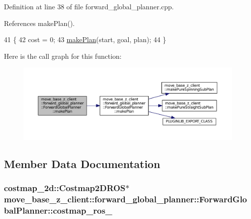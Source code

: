 Definition at line 38 of file forward\+\_\+global\+\_\+planner.\+cpp.



References make\+Plan().


\begin{DoxyCode}
41 \{
42     cost = 0;
43     \hyperlink{classmove__base__z__client_1_1forward__global__planner_1_1ForwardGlobalPlanner_a2dcf9aad74efaaa92ee78650f7a23096}{makePlan}(start, goal, plan);
44 \}
\end{DoxyCode}


Here is the call graph for this function\+:
\nopagebreak
\begin{figure}[H]
\begin{center}
\leavevmode
\includegraphics[width=350pt]{classmove__base__z__client_1_1forward__global__planner_1_1ForwardGlobalPlanner_a16f21fc4735c26535517678d29a6f1f3_cgraph}
\end{center}
\end{figure}




\subsection{Member Data Documentation}
\subsubsection[{\texorpdfstring{costmap\+\_\+ros\+\_\+}{costmap_ros_}}]{\setlength{\rightskip}{0pt plus 5cm}costmap\+\_\+2d\+::\+Costmap2\+D\+R\+OS$\ast$ move\+\_\+base\+\_\+z\+\_\+client\+::forward\+\_\+global\+\_\+planner\+::\+Forward\+Global\+Planner\+::costmap\+\_\+ros\+\_\+\hspace{0.3cm}{\ttfamily [private]}}\hypertarget{classmove__base__z__client_1_1forward__global__planner_1_1ForwardGlobalPlanner_aba11d85f5f4c9370873195ca97497a22}{}\label{classmove__base__z__client_1_1forward__global__planner_1_1ForwardGlobalPlanner_aba11d85f5f4c9370873195ca97497a22}


